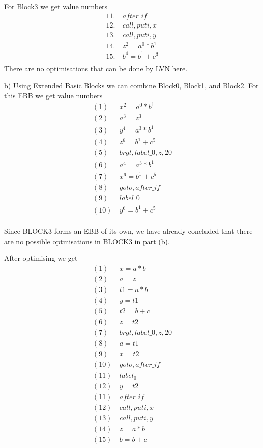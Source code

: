 \documentclass{article}
\begin{document}
For Block3 we get value numbers
\begin{align*}
    11.\  & after\_if       \\
    12.\  & call, puti, x   \\
    13.\  & call, puti, y   \\
    14.\  & z^2 = a^0 * b^1 \\
    15.\  & b^4 = b^1 + c^3 \\
\end{align*}
There are no optimisations that can be done by LVN here.

b)
Using Extended Basic Blocks we can combine Block0, Block1, and Block2.
For this EBB we get value numbers
\begin{align*}
    (1)\   & x^2 = a^0 * b^1       \\
    (2)\   & a^3 = z^3             \\
    (3)\   & y^4 = a^3 * b^1       \\
    (4)\   & z^6 = b^1 + c^5       \\
    (5)\   & brgt, label\_0, z, 20 \\
    (6)\   & a^4 = a^3 * b^1       \\
    (7)\   & x^6 = b^1 + c^5       \\
    (8)\   & goto, after\_if       \\
    (9)\   & label\_0              \\
    (10)\  & y^6 = b^1 + c^5       \\
\end{align*}

Since BLOCK3 forms an EBB of its own, we have already concluded that there
are no possible optmisations in BLOCK3 in part (b).

After optimising we get
\begin{align*}
    (1)\   & x = a * b             \\
    (2)\   & a = z                 \\
    (3)\   & t1 = a * b            \\
    (4)\   & y = t1                \\
    (5)\   & t2 = b + c            \\
    (6)\   & z = t2                \\
    (7)\   & brgt, label\_0, z, 20 \\
    (8)\   & a = t1                \\
    (9)\   & x = t2                \\
    (10)\  & goto, after\_if       \\
    (11)\  & label_0               \\
    (12)\  & y = t2                \\
    (11)\  & after\_if             \\
    (12)\  & call, puti, x         \\
    (13)\  & call, puti, y         \\
    (14)\  & z = a * b             \\
    (15)\  & b = b + c             \\
\end{align*}
\end{document}
